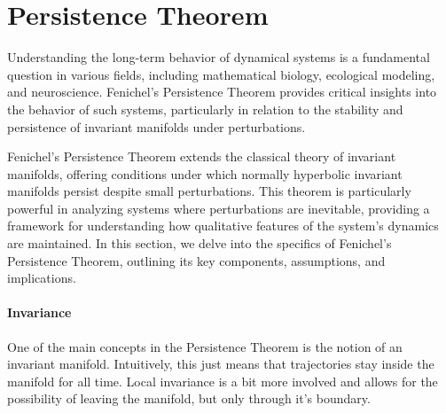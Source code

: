\documentclass{article} %
\newcounter{ct}
\theoremstyle{definition}
\theoremstyle{remark}
\begin{document}
%
%
%


\newpage
\section{Persistence Theorem}\label{sec:supp:persistence_extra}
Understanding the long-term behavior of dynamical systems is a fundamental question in various fields, including mathematical biology, ecological modeling, and neuroscience.
 Fenichel's Persistence Theorem provides critical insights into the behavior of such systems, particularly in relation to the stability and persistence of invariant manifolds under perturbations.

Fenichel's Persistence Theorem extends the classical theory of invariant manifolds, offering conditions under which normally hyperbolic invariant manifolds persist despite small perturbations.
This theorem is particularly powerful in analyzing systems where perturbations are inevitable, providing a  framework for understanding how qualitative features of the system's dynamics are maintained.
In this section, we delve into the specifics of Fenichel's Persistence Theorem, outlining its key components, assumptions, and implications.


\paragraph{Invariance}
One of the main concepts in the Persistence Theorem is the notion of an invariant manifold.
Intuitively, this just means that trajectories stay inside the manifold for all time.
Local invariance is a bit more involved and allows for the possibility of leaving the manifold, but only through it's boundary.
\end{document}
